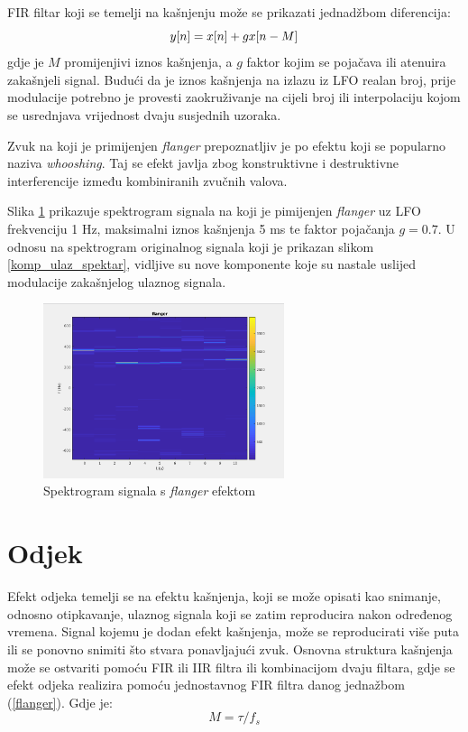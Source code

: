 \documentclass[conference]{IEEEtran}
\begin{document}
FIR filtar koji se temelji na kašnjenju može se prikazati jednadžbom diferencija:
\begin{equation}
  y[n]=x[n]+g\*x[n-M]
  \label{flanger}
\end{equation}
gdje je $M$ promijenjivi iznos kašnjenja, a $g$ faktor kojim se pojačava ili atenuira zakašnjeli signal.
Budući da je iznos kašnjenja na izlazu iz LFO realan broj, prije modulacije potrebno je provesti zaokruživanje
na cijeli broj ili interpolaciju kojom se usrednjava vrijednost dvaju susjednih uzoraka.

Zvuk na koji je primijenjen \textit{flanger} prepoznatljiv je po efektu koji se popularno naziva
\textit{whooshing}. Taj se efekt javlja zbog konstruktivne i destruktivne interferencije između kombiniranih
zvučnih valova.

Slika \ref{flang_spektar} prikazuje spektrogram signala na koji je pimijenjen \textit{flanger} uz LFO
frekvenciju 1 Hz, maksimalni iznos kašnjenja 5 ms te faktor pojačanja $g=0.7$. U odnosu na spektrogram originalnog
signala koji je prikazan slikom \ref{komp_ulaz_spektar}, vidljive su nove komponente koje su nastale uslijed
modulacije zakašnjelog ulaznog signala.

\begin{figure}[H]
    \includegraphics[width=200pt]{slike/flanger_spektar.png}
    \centering
    \caption{Spektrogram signala s \textit{flanger} efektom}
    \label{flang_spektar}
\end{figure}

\section{Odjek}

Efekt odjeka temelji se na efektu kašnjenja, koji se može opisati kao snimanje, odnosno otipkavanje, ulaznog signala
koji se zatim reproducira nakon određenog vremena. Signal kojemu je dodan efekt kašnjenja, može se
reproducirati više puta ili se ponovno snimiti što stvara ponavljajući zvuk. Osnovna struktura kašnjenja može
se ostvariti pomoću FIR ili IIR filtra ili kombinacijom dvaju filtara, gdje se efekt odjeka realizira pomoću
jednostavnog FIR filtra danog jednažbom (\ref{flanger}).
Gdje je:
\begin{equation}
  M = \tau/f_{s}
  \label{M}
\end{equation}
\end{document}
